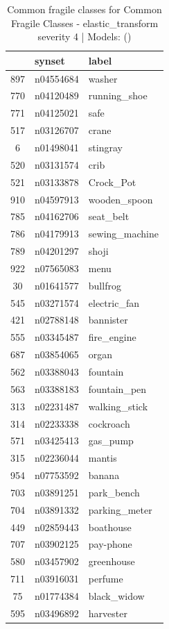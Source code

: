 \begin{table}
\caption{Common fragile classes for Common Fragile Classes - elastic_transform severity 4 | Models: ()}
\label{tab:Common Fragile Classes - elastic_transform severity 4_d41d8cd9}
\begin{tabular}{cll}
\toprule
 & synset & label \\
\midrule
897 & n04554684 & washer \\
770 & n04120489 & running_shoe \\
771 & n04125021 & safe \\
517 & n03126707 & crane \\
6 & n01498041 & stingray \\
520 & n03131574 & crib \\
521 & n03133878 & Crock_Pot \\
910 & n04597913 & wooden_spoon \\
785 & n04162706 & seat_belt \\
786 & n04179913 & sewing_machine \\
789 & n04201297 & shoji \\
922 & n07565083 & menu \\
30 & n01641577 & bullfrog \\
545 & n03271574 & electric_fan \\
421 & n02788148 & bannister \\
555 & n03345487 & fire_engine \\
687 & n03854065 & organ \\
562 & n03388043 & fountain \\
563 & n03388183 & fountain_pen \\
313 & n02231487 & walking_stick \\
314 & n02233338 & cockroach \\
571 & n03425413 & gas_pump \\
315 & n02236044 & mantis \\
954 & n07753592 & banana \\
703 & n03891251 & park_bench \\
704 & n03891332 & parking_meter \\
449 & n02859443 & boathouse \\
707 & n03902125 & pay-phone \\
580 & n03457902 & greenhouse \\
711 & n03916031 & perfume \\
75 & n01774384 & black_widow \\
595 & n03496892 & harvester \\

\end{tabular}
\end{table}
